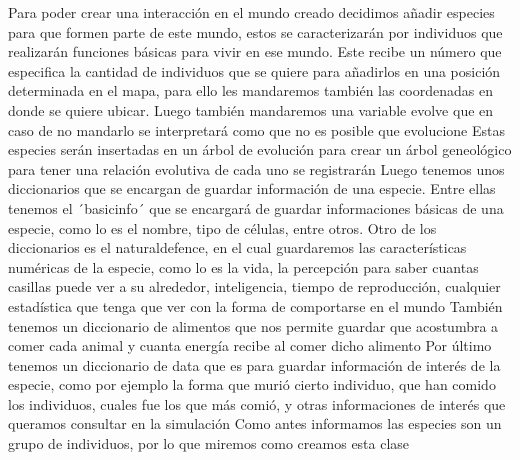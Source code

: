 \documentclass{llncs}
\begin{document}
Para poder crear una interacción en el mundo creado decidimos añadir especies para que formen parte de este mundo, estos se caracterizarán por individuos que realizarán funciones básicas para vivir en ese mundo.
\newline
\newline
Este recibe un número que especifica la cantidad de individuos que se quiere para añadirlos en una posición determinada en el mapa, para ello les mandaremos también las coordenadas en donde se quiere ubicar. Luego también mandaremos una variable evolve que en caso de no mandarlo se interpretará como que no es posible que evolucione
\newline
\newline
Estas especies serán insertadas en un árbol de evolución para crear un árbol geneológico para tener una relación evolutiva de cada uno se registrarán
\newline
\newline
Luego tenemos unos diccionarios que se encargan de guardar información de una especie. Entre ellas tenemos el ´basicinfo´ que se encargará de guardar informaciones básicas de una especie, como lo es el nombre, tipo de células, entre otros.
\newline
\newline
Otro de los diccionarios es el naturaldefence, en el cual guardaremos las características numéricas de la especie, como lo es la vida, la percepción para saber cuantas casillas puede ver a su alrededor, inteligencia, tiempo de reproducción, cualquier estadística que tenga que ver con la forma de comportarse en el mundo
\newline
\newline
También tenemos un diccionario de alimentos que nos permite guardar que acostumbra a comer cada animal y cuanta energía recibe al comer dicho alimento
\newline
\newline
Por último tenemos un diccionario de data que es para guardar información de interés de la especie, como por ejemplo la forma que murió cierto individuo, que han comido los individuos, cuales fue los que más comió, y otras informaciones de interés que queramos consultar en la simulación
\newline
\newline
Como antes informamos las especies son un grupo de individuos, por lo que miremos como creamos esta clase
\end{document}
